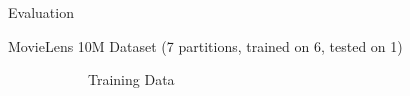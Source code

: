 \documentclass[final]{beamer}
\begin{document}
{\begin{frame}{}
\begin{center}
\begin{columns}[t]
\begin{column}{0.32\textwidth}
\begin{block}{\huge Evaluation}
\begin{itemize}
{\item MovieLens 10M Dataset (7 partitions, trained on 6, tested on 1)
\begin{figure}
	\begin{subfigure}[b]{.45\textwidth}
\begin{center}
		\caption{Training Data}
\end{center}
	\end{subfigure}
\hspace{1cm}
	\begin{subfigure}[b]{.45\textwidth}
\begin{center}

\end{center}
\end{subfigure}
\end{figure}}
\end{itemize}
\end{block}
\end{column}
\end{columns}
\end{center}
\end{frame}}
\end{document}
